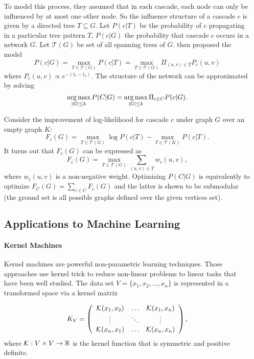 To model this process, they assumed that in each cascade, each node can only be influenced by at most one other node. So the influence structure of a cascade $c$ is given by a directed tree $T \subseteq G$. Let $P(c|T)$ be the probability of $c$ propagating in a particular tree pattern $T$, $P(c|G)$ the probability that cascade $c$ occurs in a network $G$. Let $\mathcal{T}(G)$ be set of all spanning trees of $G$. \cite{GLK10} then proposed the model 
$$P(c|G) = \max_{T\in\mathcal{T}(G)}P(c|T) = \max_{T\in\mathcal{T}(G)}\Pi_{(u,v)\in T}P_c(u,v)$$
where $P_c(u, v) \propto e^{-(t_v - t_u)}$. The structure of the network can be approximated by solving 
 $$\operatorname*{arg\,max}_{|G|\leq k} P(C|G) = \operatorname*{arg\,max}_{|G|\leq k}\Pi_{c\in C}P(c|G).$$


Consider the improvement of log-likelihood for cascade $c$ under graph $G$ over an empty graph $K$:
$$F_c(G) = \max_{T\in \mathcal{T}(G)}\log P(c|T) - \max_{T\in \mathcal{T}(K)}P(c|T).$$
It turns out that $F_c(G)$ can be expressed as 
$$F_c(G) = \max_{T\in\mathcal{T}(G)}\sum_{(u, v)\in T}w_c(u, v),$$
where $w_c(u, v)$ is a non-negative weight. Optimizing $P(C|G)$ is equivalently to optimize $F_C(G) = \sum_{c\in C}F_c(G)$ and the latter is shown to be submodular (the ground set is all possible graphs defined over the given vertices set). 






\subsection{Applications to Machine Learning}
\paragraph{Kernel Machines}
Kernel machines \cite{SS02} are powerful non-parametric learning techniques. Those approaches use kernel trick to reduce non-linear problems to linear tasks that have been well studied. The data set $V = \{x_1, x_2, \ldots, x_n\}$ is represented in a transformed space via a kernel matrix

\[ K_V = \left( \begin{array}{ccc}
\mathcal{K}(x_1, x_2) & \ldots & \mathcal{K}(x_1, x_n) \\
\vdots & \ddots & \vdots \\
\mathcal{K}(x_n,x_1) & \ldots & \mathcal{K}(x_n, x_n) \end{array} \right),\] 
where $\mathcal{K}: V\times V \rightarrow \mathbb{R}$ is the kernel function that is symmetric and positive definite. 

